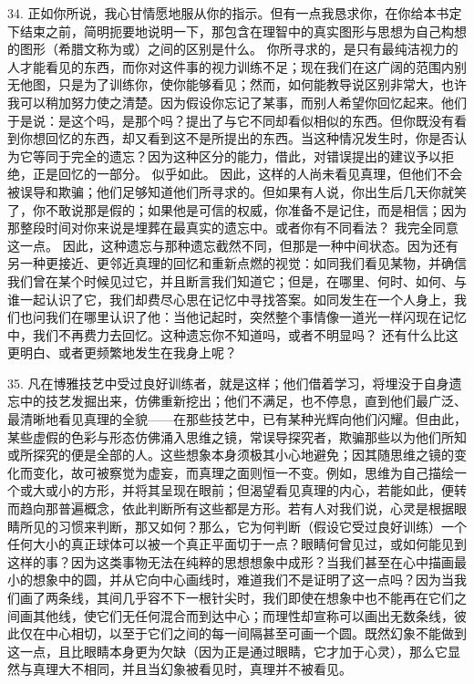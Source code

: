 34.  正如你所说，我心甘情愿地服从你的指示。但有一点我恳求你，在你给本书定下结束之前，简明扼要地说明一下，那包含在理智中的真实图形与思想为自己构想的图形（希腊文称为或）之间的区别是什么。 你所寻求的，是只有最纯洁视力的人才能看见的东西，而你对这件事的视力训练不足；现在我们在这广阔的范围内别无他图，只是为了训练你，使你能够看见；然而，如何能教导说区别非常大，也许我可以稍加努力使之清楚。因为假设你忘记了某事，而别人希望你回忆起来。他们于是说：是这个吗，是那个吗？提出了与它不同却看似相似的东西。但你既没有看到你想回忆的东西，却又看到这不是所提出的东西。当这种情况发生时，你是否认为它等同于完全的遗忘？因为这种区分的能力，借此，对错误提出的建议予以拒绝，正是回忆的一部分。 似乎如此。 因此，这样的人尚未看见真理，但他们不会被误导和欺骗；他们足够知道他们所寻求的。但如果有人说，你出生后几天你就笑了，你不敢说那是假的；如果他是可信的权威，你准备不是记住，而是相信；因为那整段时间对你来说是埋葬在最真实的遗忘中。或者你有不同看法？ 我完全同意这一点。 因此，这种遗忘与那种遗忘截然不同，但那是一种中间状态。因为还有另一种更接近、更邻近真理的回忆和重新点燃的视觉：如同我们看见某物，并确信我们曾在某个时候见过它，并且断言我们知道它；但是，在哪里、何时、如何、与谁一起认识了它，我们却费尽心思在记忆中寻找答案。如同发生在一个人身上，我们也问我们在哪里认识了他：当他记起时，突然整个事情像一道光一样闪现在记忆中，我们不再费力去回忆。这种遗忘你不知道吗，或者不明显吗？ 还有什么比这更明白、或者更频繁地发生在我身上呢？\par

35. 凡在博雅技艺中受过良好训练者，就是这样；他们借着学习，将埋没于自身遗忘中的技艺发掘出来，仿佛重新挖出；他们不满足，也不停息，直到他们最广泛、最清晰地看见真理的全貌——在那些技艺中，已有某种光辉向他们闪耀。但由此，某些虚假的色彩与形态仿佛涌入思维之镜，常误导探究者，欺骗那些以为他们所知或所探究的便是全部的人。这些想象本身须极其小心地避免；因其随思维之镜的变化而变化，故可被察觉为虚妄，而真理之面则恒一不变。例如，思维为自己描绘一个或大或小的方形，并将其呈现在眼前；但渴望看见真理的内心，若能如此，便转而趋向那普遍概念，依此判断所有这些都是方形。若有人对我们说，心灵是根据眼睛所见的习惯来判断，那又如何？那么，它为何判断（假设它受过良好训练）一个任何大小的真正球体可以被一个真正平面切于一点？眼睛何曾见过，或如何能见到这样的事？因为这类事物无法在纯粹的思想想象中成形？当我们甚至在心中描画最小的想象中的圆，并从它向中心画线时，难道我们不是证明了这一点吗？因为当我们画了两条线，其间几乎容不下一根针尖时，我们即使在想象中也不能再在它们之间画其他线，使它们无任何混合而到达中心；而理性却宣称可以画出无数条线，彼此仅在中心相切，以至于它们之间的每一间隔甚至可画一个圆。既然幻象不能做到这一点，且比眼睛本身更为欠缺（因为正是通过眼睛，它才加于心灵），那么它显然与真理大不相同，并且当幻象被看见时，真理并不被看见。\par

